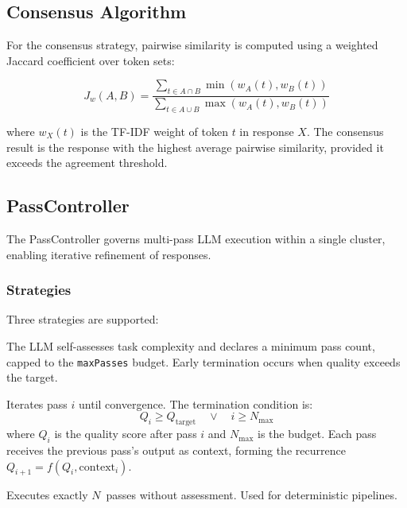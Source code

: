 \documentclass[journal,10pt]{IEEEtran}
\newcommand{\code}[1]{\texttt{#1}}
\begin{document}
\subsection{Consensus Algorithm}

For the consensus strategy, pairwise similarity is computed using a weighted Jaccard coefficient over token sets:

\begin{equation}
J_w(A, B) = \frac{\sum_{t \in A \cap B} \min(w_A(t), w_B(t))}{\sum_{t \in A \cup B} \max(w_A(t), w_B(t))}
\label{eq:jaccard}
\end{equation}

\noindent where $w_X(t)$ is the TF-IDF weight of token $t$ in response $X$. The consensus result is the response with the highest average pairwise similarity, provided it exceeds the agreement threshold.

\subsection{PassController}
\label{sec:passcontroller}

The PassController governs multi-pass LLM execution within a single cluster, enabling iterative refinement of responses.

\subsubsection{Strategies}

Three strategies are supported:

\begin{description}[nosep,style=unboxed,leftmargin=0pt,font=\normalfont\itshape]
\item[Min-passes.] The LLM self-assesses task complexity and declares a minimum pass count, capped to the \code{maxPasses} budget. Early termination occurs when quality exceeds the target.

\item[Quality-target.] Iterates pass $i$ until convergence. The termination condition is:
\begin{equation}
Q_i \geq Q_{\text{target}} \quad \vee \quad i \geq N_{\max}
\label{eq:passterm}
\end{equation}
where $Q_i$ is the quality score after pass $i$ and $N_{\max}$ is the budget. Each pass receives the previous pass's output as context, forming the recurrence $Q_{i+1} = f(Q_i, \text{context}_i)$.

\item[Fixed.] Executes exactly $N$~passes without assessment. Used for deterministic pipelines.
\end{description}
\end{document}
